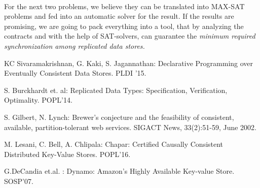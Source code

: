 \documentclass[runningheads]{llncs}
\begin{document}
\paragraph{} For the next two problems, we believe they can be translated into MAX-SAT problems and fed into an automatic solver for the result.  If the results are promising, we are going to pack everything into a tool, that by analyzing the contracts and with the help of SAT-solvers, can guarantee the \emph{minimum required synchronization among replicated data stores.}  
















\begin{thebibliography}{4}

 KC Sivaramakrishnan, G. Kaki, S. Jagannathan: Declarative Programming over
Eventually Consistent Data Stores. PLDI '15. 

 S. Burckhardt et. al: Replicated Data Types: Specification, Verification, Optimality. POPL'14.


 S. Gilbert, N. Lynch: Brewer's conjecture and the feasibility of
consistent, available, partition-tolerant web services. SIGACT News,
33(2):51-59, June 2002. 

 M. Lesani, C. Bell, A. Chlipala: Chapar: Certified Causally Consistent
Distributed Key-Value Stores. POPL'16.

 G.DeCandia et.al. : Dynamo: Amazon's Highly Available Key-value Store. SOSP'07.



\end{thebibliography}
\end{document}
